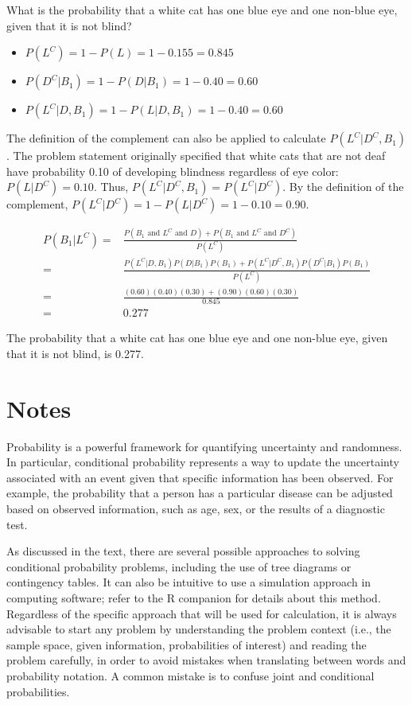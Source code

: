 \begin{example}{What is the probability that a white cat has one blue eye and one non-blue eye, given that it is not blind?}
	\begin{itemize}
		\item $P(L^C) = 1 - P(L) = 1 - 0.155 = 0.845$
		\item $P(D^C|B_1) = 1 - P(D|B_1) = 1 - 0.40 = 0.60$
		\item $P(L^C|D, B_1) = 1 - P(L|D, B_1) = 1 - 0.40 = 0.60$
	\end{itemize}
	
	The definition of the complement can also be applied to calculate $P(L^C|D^C, B_1)$. The problem statement originally specified that white cats that are not deaf have probability 0.10 of developing blindness regardless of eye color: $P(L|D^C) = 0.10$. Thus, $P(L^C|D^C, B_1) = P(L^C|D^C)$. By the definition of the complement, $P(L^C|D^C) = 1 - P(L|D^C) = 1 - 0.10 = 0.90$.
	
	\begin{align*}
	P(B_1|L^C) =& \frac{P(B_1 \textrm{ and } L^C \textrm{ and } D) + P(B_1 \textrm{ and } L^C \textrm{ and } D^C)}{P(L^C)}\\
	=& \frac{P(L^C|D, B_1)P(D|B_1)P(B_1) + P(L^C|D^C, B_1)P(D^C|B_1)P(B_1)}{P(L^C)} \\
	=& \frac{(0.60)(0.40)(0.30) + (0.90)(0.60)(0.30)}{0.845} \\
	=& 0.277 
	\end{align*} 
	
	The probability that a white cat has one blue eye and one non-blue eye, given that it is not blind, is 0.277.
\end{example}

\newpage

\section{Notes}

Probability is a powerful framework for quantifying uncertainty and randomness. In particular, conditional probability represents a way to update the uncertainty associated with an event given that specific information has been observed. For example, the probability that a person has a particular disease can be adjusted based on observed information, such as age, sex, or the results of a diagnostic test.

As discussed in the text, there are several possible approaches to solving conditional probability problems, including the use of tree diagrams or contingency tables. It can also be intuitive to use a simulation approach in computing software; refer to the \textsf{R} companion for details about this method. Regardless of the specific approach that will be used for calculation, it is always advisable to start any problem by understanding the problem context (i.e., the sample space, given information, probabilities of interest) and reading the problem carefully, in order to avoid mistakes when translating between words and probability notation. A common mistake is to confuse joint and conditional probabilities.

